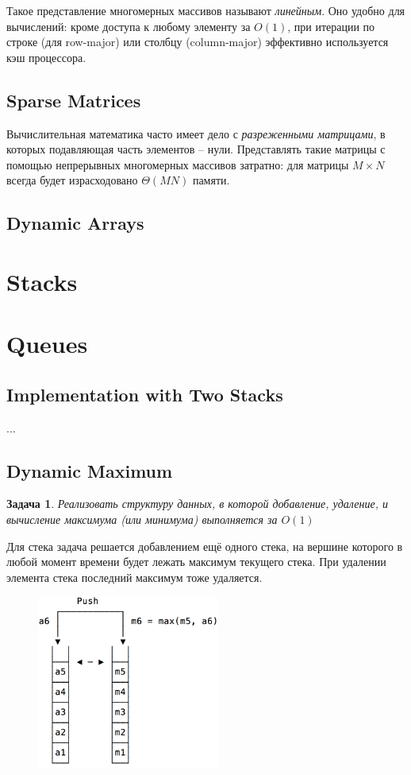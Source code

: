 \documentclass[12pt,a4paper]{report}
\newtheorem*{problem}{Задача}
\begin{document}
Такое представление многомерных массивов называют {\em линейным}. Оно удобно для вычислений: кроме доступа к любому элементу за $O(1)$, при итерации по строке (для row-major) или столбцу (column-major) эффективно используется кэш процессора.

\subsection*{Sparse Matrices}

Вычислительная математика часто имеет дело с {\em разреженными матрицами}, в которых подавляющая часть элементов -- нули. Представлять такие матрицы с помощью непрерывных многомерных массивов затратно: для матрицы $M\times N$ всегда будет израсходовано $\Theta(MN)$ памяти.

\subsection*{Dynamic Arrays}

\section*{Stacks}

\section*{Queues}

\subsection*{Implementation with Two Stacks}

...


\subsection*{Dynamic Maximum}

\begin{problem}
Реализовать структуру данных, в которой добавление, удаление, и вычисление максимума (или минимума) выполняется за $O(1)$
\end{problem}

Для стека задача решается добавлением ещё одного стека, на вершине которого в любой момент времени будет лежать максимум текущего стека. При удалении элемента стека последний максимум тоже удаляется.

\begin{figure}[!ht]
\centering
\includegraphics[width=6cm]{maxstack.png}
\end{figure}
\end{document}
